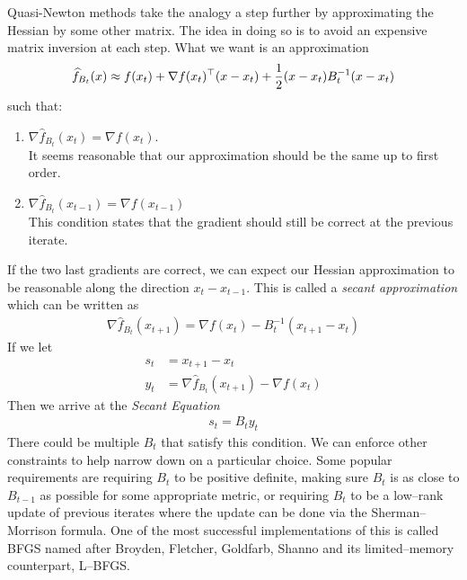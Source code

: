 Quasi-Newton methods take 
the analogy a step further by approximating the Hessian by some other matrix.
The idea in doing so is to avoid an expensive matrix inversion at each step.
What we want is an approximation
\begin{align*}
    \widehat{f}_{B_t}(x) \approx f(x_t) + \nabla f(x_t)^\top (x - x_t) + \dfrac{1}{2} (x-x_t)B_t^{-1} (x-x_t)
\end{align*}
such that:
\begin{enumerate}
    \item $\nabla \hat{f}_{B_t} (x_t) = \nabla f(x_t)$.\\
    It seems reasonable that our approximation should be the same up to first order. 
    \item $\nabla \hat{f}_{B_t} (x_{t-1}) = \nabla f(x_{t-1})$\\
    This condition states that the gradient should still be correct at the previous iterate.
\end{enumerate}
 If the two last gradients are correct, we can expect our Hessian approximation to be reasonable along the direction $x_t - x_{t-1}$. This is called a \emph{secant approximation} which can be written as 
 \begin{align*}
     \nabla \hat{f}_{B_t} (x_{t+1}) = \nabla f(x_t) - B_t^{-1}(x_{t+1} - x_t)
 \end{align*}
 If we let
 \begin{align*}
     s_t &= x_{t+1} - x_t \\
     y_t &= \nabla \hat{f}_{B_t}(x_{t+1}) - \nabla f(x_t)
 \end{align*}
 Then we arrive at the \emph{Secant Equation}
 \begin{align*}
     s_t = B_{t} y_t
 \end{align*}
 There could be multiple $B_t$ that satisfy this condition. We can enforce other constraints to help narrow down on a particular choice. Some popular requirements are requiring $B_t$ to be positive definite, making sure $B_t$ is as close to $B_{t-1}$ as possible for some appropriate metric, or requiring $B_t$ to be a low--rank update of previous iterates where the update can be done via the Sherman--Morrison formula.  One of the most successful implementations of this is called BFGS named after Broyden, Fletcher, Goldfarb, Shanno and its limited--memory counterpart, L--BFGS.
